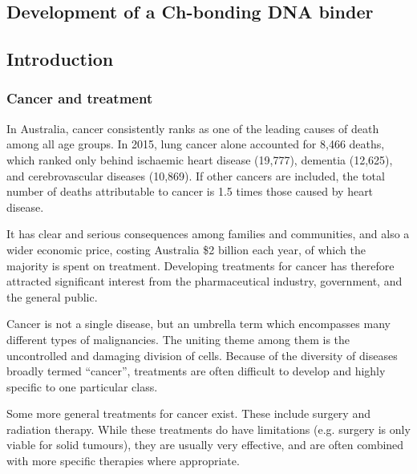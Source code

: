 \begin{refsection}

\chapter{Development of a Ch-bonding DNA binder}
\label{ch:dna-binder}

\section{Introduction}

\subsection{Cancer and treatment}
In Australia, cancer consistently ranks as one of the leading causes of death among all age groups. In 2015, lung cancer alone accounted for 8,466 deaths, which ranked only behind ischaemic heart disease (19,777), dementia (12,625), and cerebrovascular diseases (10,869).
If other cancers are included, the total number of deaths attributable to cancer is 1.5 times those caused by heart disease\autocite{abs2015}.

It has clear and serious consequences among families and communities, and also a wider economic price, costing Australia \$2 billion each year, of which the majority is spent on treatment\autocite{Mathers1998}.
Developing treatments for cancer has therefore attracted significant interest from the pharmaceutical industry, government, and the general public\autocite{Rankin2015}.

Cancer is not a single disease, but an umbrella term which encompasses many different types of malignancies.
The uniting theme among them is the uncontrolled and damaging division of cells.
Because of the diversity of diseases broadly termed ``cancer'', treatments are often difficult to develop and highly specific to one particular class\autocite{Hanahan2011}.

Some more general treatments for cancer exist.
These include surgery and radiation therapy.
While these treatments do have limitations (e.g. surgery is only viable for solid tumours), they are usually very effective, and are often combined with more specific therapies where appropriate.



\end{refsection}
